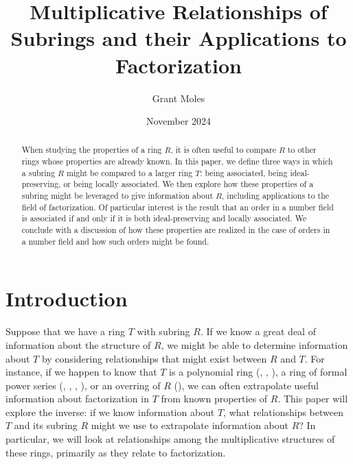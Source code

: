 \documentclass[12pt]{amsart}
\title[Multiplicative Subring Relations]{Multiplicative Relationships of Subrings and their Applications to Factorization}
\author{Grant Moles}
\date{November 2024}
\theoremstyle{definition}
\begin{document}
	
	\begin{abstract}
		When studying the properties of a ring $R$, it is often useful to compare $R$ to other rings whose properties are already known. In this paper, we define three ways in which a subring $R$ might be compared to a larger ring $T$: being associated, being ideal-preserving, or being locally associated. We then explore how these properties of a subring might be leveraged to give information about $R$, including applications to the field of factorization. Of particular interest is the result that an order in a number field is associated if and only if it is both ideal-preserving and locally associated. We conclude with a discussion of how these properties are realized in the case of orders in a number field and how such orders might be found.
	\end{abstract}
	
	\maketitle
	
	\section{Introduction}
	
	Suppose that we have a ring $T$ with subring $R$. If we know a great deal of information about the structure of $R$, we might be able to determine information about $T$ by considering relationships that might exist between $R$ and $T$. For instance, if we happen to know that $T$ is a polynomial ring (\cite{coykendallpolynomial}, \cite{CO1}, \cite{Co2005}), a ring of formal power series (\cite{MO1}, \cite{dissertation}, \cite{radicalconductor}, \cite{Co2005}), or an overring of $R$ (\cite{overrings}), we can often extrapolate useful information about factorization in $T$ from known properties of $R$. This paper will explore the inverse: if we know information about $T$, what relationships between $T$ and its subring $R$ might we use to extrapolate information about $R$? In particular, we will look at relationships among the multiplicative structures of these rings, primarily as they relate to factorization.
	
\end{document}
